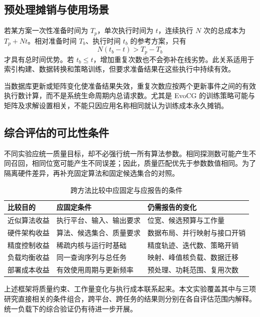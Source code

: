 \subsection{预处理摊销与使用场景}
若某方案一次性准备时间为 $T_p$，单次执行时间为 $t$，连续执行 $N$ 次的总成本为 $T_p+Nt$。相对准备时间 $T_b$、执行时间 $t_b$ 的参考方案，只有
\begin{equation}
 N(t_b-t)>T_p-T_b
\end{equation}
才具有总时间优势。若 $t_b\leq t$，增加重复次数也不会弥补在线劣势。此关系适用于索引构建、数据转换和策略训练，但要求准备结果在这些执行中持续有效。

当数据库更新或矩阵变化使准备结果失效，重复次数应按两个更新事件之间的有效执行数计算，而不是系统生命周期内总请求数。尤其是 EvoCG 的训练策略可能与矩阵及求解设置相关，不能只因应用名称相同就认为训练成本永久摊销。

\subsection{综合评估的可比性条件}
不同实验应统一质量目标，却不必强行统一所有算法参数。相同探测数可能产生不同召回，相同位宽可能产生不同误差；因此，质量匹配优先于参数数值相同。为了隔离硬件差异，再补充固定算法和固定候选集合的对照。

\begin{table}[htbp]\centering\caption{跨方法比较中应固定与应报告的条件}
\begin{tabularx}{\textwidth}{p{2.5cm}XX}\toprule
比较目的&应固定条件&仍需报告的变化\\\midrule
近似算法收益&执行平台、输入、输出要求&位宽、候选预算与工作量\\
硬件架构收益&算法、候选集合、质量要求&数据布局、并行映射与接口开销\\
精度控制收益&稀疏内核与运行时基础&精度轨迹、迭代数、策略开销\\
负载均衡收益&同一查询序列与总任务&映射、峰值核负载、数据迁移\\
部署成本收益&有效使用周期与更新频率&预处理、功耗范围、复用次数\\\bottomrule
\end{tabularx}\end{table}

上述框架将质量约束、工作量变化与执行成本联系起来。本文实验覆盖其中与三项研究直接相关的条件组合，跨平台、跨任务的结果则分别在各自评估范围内解释。统一负载下的综合验证仍有待进一步开展。
